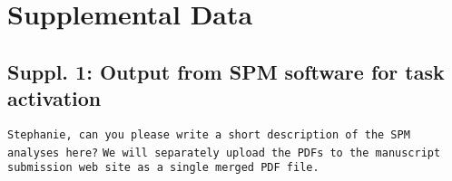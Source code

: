 \section*{Supplemental Data}
\subsection{Suppl. 1: Output from SPM software for task activation}
\verb|Stephanie, can you please write a short description of the SPM analyses here?|
\verb|We will separately upload the PDFs to the manuscript submission web site as a single merged PDF file.|
